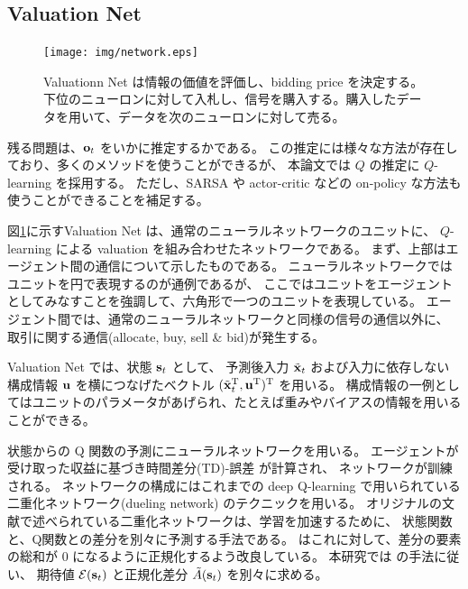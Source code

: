 %
%
%
%


\iffalse
\subsection{Valuation Net}

\begin{figure}[t]
\centering
\texttt{[image: img/network.eps]}
\caption{
Valuationn Net は情報の価値を評価し、bidding price を決定する。
下位のニューロンに対して入札し、信号を購入する。購入したデータを用いて、データを次のニューロンに対して売る。
}
\label{fig:network}
\end{figure}

残る問題は、$\mathrm{\mathbf{o}}_t$ をいかに推定するかである。
この推定には様々な方法が存在しており、多くのメソッドを使うことができるが、
本論文では $Q$ の推定に $Q$-learning を採用する。
ただし、SARSA や actor-critic などの on-policy な方法も使うことができることを補足する。

図\ref{fig:network}に示すValuation Net は、通常のニューラルネットワークのユニットに、
$Q$-learning による valuation を組み合わせたネットワークである。
まず、上部はエージェント間の通信について示したものである。
ニューラルネットワークではユニットを円で表現するのが通例であるが、
ここではユニットをエージェントとしてみなすことを強調して、六角形で一つのユニットを表現している。
エージェント間では、通常のニューラルネットワークと同様の信号の通信以外に、
取引に関する通信(allocate, buy, sell \& bid)が発生する。

Valuation Net では、状態 $\mathrm{\mathbf{s}}_t$ として、
予測後入力 $\tilde{\mathrm{\mathbf{x}}}_t$ および入力に依存しない構成情報 $\mathrm{\mathbf{u}}$ を横につなげたベクトル $(\tilde{\mathrm{\mathbf{x}}}_t^{\mathrm{T}}, \mathrm{\mathbf{u}}^{\mathrm{T}})^{\mathrm{T}}$ を用いる。
構成情報の一例としてはユニットのパラメータがあげられ、たとえば重みやバイアスの情報を用いることができる。

状態からの Q 関数の予測にニューラルネットワークを用いる。
エージェントが受け取った収益に基づき時間差分(TD)-誤差 が計算され、
ネットワークが訓練される。
ネットワークの構成にはこれまでの deep Q-learning で用いられている二重化ネットワーク(dueling network) \citep{wang2015dueling} のテクニックを用いる。
オリジナルの文献\citep{wang2015dueling}で述べられている二重化ネットワークは、学習を加速するために、
状態関数と、Q関数との差分を別々に予測する手法である。
\cite{dosovitskiy2016learning} はこれに対して、差分の要素の総和が 0 になるように正規化するよう改良している。
本研究では \cite{dosovitskiy2016learning} の手法に従い、
期待値 $\mathcal{E}(\mathrm{\mathbf{s}}_t)$ と正規化差分 $\tilde{A}(\mathrm{\mathbf{s}}_t)$ を別々に求める。

